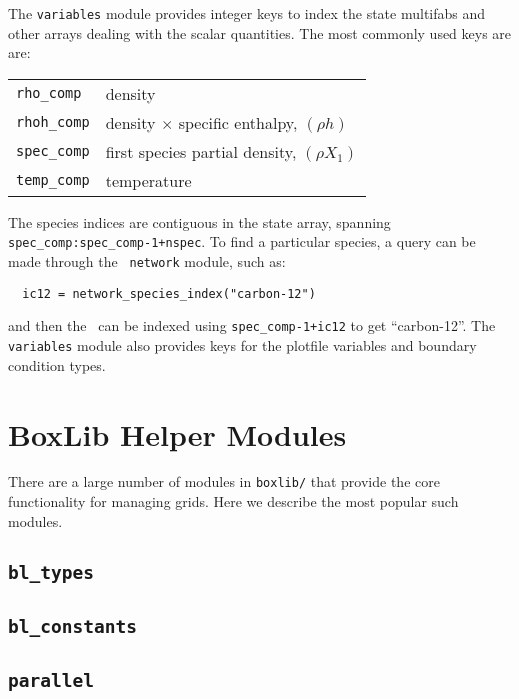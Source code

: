 \label{sec:variables_module}

The {\tt variables} module provides integer keys to index the state
multifabs and other arrays dealing with the scalar quantities.  The
most commonly used keys are are:

\begin{center}
\begin{tabular}{ll}
\hline
{\tt rho\_comp}  & density \\
{\tt rhoh\_comp} & density $\times$ specific enthalpy, $(\rho h)$ \\
{\tt spec\_comp} & first species partial density, $(\rho X_1)$ \\
{\tt temp\_comp} & temperature \\
\hline
\end{tabular}
\end{center}

The species indices are contiguous in the state array, spanning {\tt spec\_comp:spec\_comp-1+nspec}.
To find a particular species, a query can be made through the {\tt
  network} module, such as:
\begin{verbatim}
  ic12 = network_species_index("carbon-12")
\end{verbatim}
and then the \fab\ can be indexed using {\tt spec\_comp-1+ic12} to
get ``carbon-12''.
The {\tt variables} module also provides keys for the plotfile
variables and boundary condition types.


\section{BoxLib Helper Modules}

There are a large number of modules in {\tt boxlib/} that provide
the core functionality for managing grids.  Here we describe
the most popular such modules.


\subsection{{\tt bl\_types}}

\subsection{{\tt bl\_constants}}

\subsection{{\tt parallel}}

